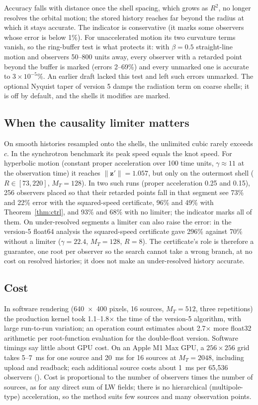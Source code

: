 \documentclass[11pt, a4paper]{article}
\begin{document}
Accuracy falls with distance once the shell spacing, which grows as $R^2$, no longer resolves the orbital motion; the stored history reaches far beyond the radius at which it stays accurate. The indicator is conservative (it marks some observers whose error is below 1\%). For unaccelerated motion its two curvature terms vanish, so the ring-buffer test is what protects it: with $\beta = 0.5$ straight-line motion and observers 50--800 units away, every observer with a retarded point beyond the buffer is marked (errors 2--69\%) and every unmarked one is accurate to $3\times10^{-5}\%$. An earlier draft lacked this test and left such errors unmarked. The optional Nyquist taper of version 5 damps the radiation term on coarse shells; it is off by default, and the shells it modifies are marked.

\subsection{When the causality limiter matters}
On smooth histories resampled onto the shells, the unlimited cubic rarely exceeds $c$. In the synchrotron benchmark its peak speed equals the knot speed. For hyperbolic motion (constant proper acceleration over 100 time units, $\gamma \approx 11$ at the observation time) it reaches $\|\mathbf{z}'\| = 1.057$, but only on the outermost shell ($R \in [73, 220]$, $M_T = 128$). In two such runs (proper acceleration 0.25 and 0.15), 256 observers placed so that their retarded points fall in that segment see 73\% and 22\% error with the squared-speed certificate, 96\% and 49\% with Theorem~\ref{thm:ctrl}, and 93\% and 68\% with no limiter; the indicator marks all of them. On under-resolved segments a limiter can also raise the error: in the version-5 float64 analysis the squared-speed certificate gave 296\% against 70\% without a limiter ($\gamma = 22.4$, $M_T = 128$, $R = 8$). The certificate's role is therefore a guarantee, one root per observer so the search cannot take a wrong branch, at no cost on resolved histories; it does not make an under-resolved history accurate.

\subsection{Cost}
In software rendering (640~$\times$~400 pixels, 16 sources, $M_T = 512$, three repetitions) the production kernel took 1.1--1.8$\times$ the time of the version-5 algorithm, with large run-to-run variation; an operation count estimates about 2.7$\times$ more float32 arithmetic per root-function evaluation for the double-float version. Software timings say little about GPU cost. On an Apple M1 Max GPU, a $256 \times 256$ grid takes 5--7~ms for one source and 20~ms for 16 sources at $M_T = 2048$, including upload and readback; each additional source costs about 1~ms per 65{,}536 observers (). Cost is proportional to the number of observers times the number of sources, as for any direct sum of LW fields; there is no hierarchical (multipole-type) acceleration, so the method suits few sources and many observation points.
\end{document}
